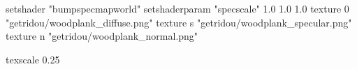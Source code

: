 setshader "bumpspecmapworld"
setshaderparam "specscale" 1.0 1.0 1.0
texture 0 "getridou/woodplank_diffuse.png"
texture s "getridou/woodplank_specular.png"
texture n "getridou/woodplank_normal.png"

texscale 0.25
